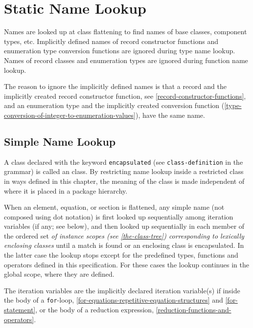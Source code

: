 \section{Static Name Lookup}\label{static-name-lookup}

Names are looked up at class flattening to find names of base classes, component types, etc.
Implicitly defined names of record constructor functions and enumeration type conversion functions are ignored during type name lookup.
Names of record classes and enumeration types are ignored during function name lookup.

\begin{nonnormative}
The reason to ignore the implicitly defined names is that a record and the implicitly created record constructor function, see \cref{record-constructor-functions}, and an enumeration type and the implicitly created conversion function (\cref{type-conversion-of-integer-to-enumeration-values}), have the same name.
\end{nonnormative}


\subsection{Simple Name Lookup}\label{simple-name-lookup}

A class declared with the keyword \lstinline!encapsulated! (see \lstinline[language=grammar]!class-definition! in the grammar) is called an  class.
By restricting name lookup inside a restricted class in ways defined in this chapter, the meaning of the class is made independent of where it is placed in a package hierarchy.

When an element, equation, or section is flattened, any simple name (not composed using dot notation) is first looked up sequentially among iteration variables (if any; see below), and then looked up sequentially in each member of the ordered set \emph{of instance scopes (see \cref{the-class-tree}) corresponding to lexically enclosing classes} until a match is found or an enclosing class is encapsulated.
In the latter case the lookup stops except for the predefined types, functions and operators defined in this specification.
For these cases the lookup continues in the global scope, where they are defined.

The iteration variables are the implicitly declared iteration variable(s) if inside the body of a \lstinline!for!-loop, \cref{for-equations-repetitive-equation-structures} and \cref{for-statement}, or the body of a reduction expression, \cref{reduction-functions-and-operators}.

